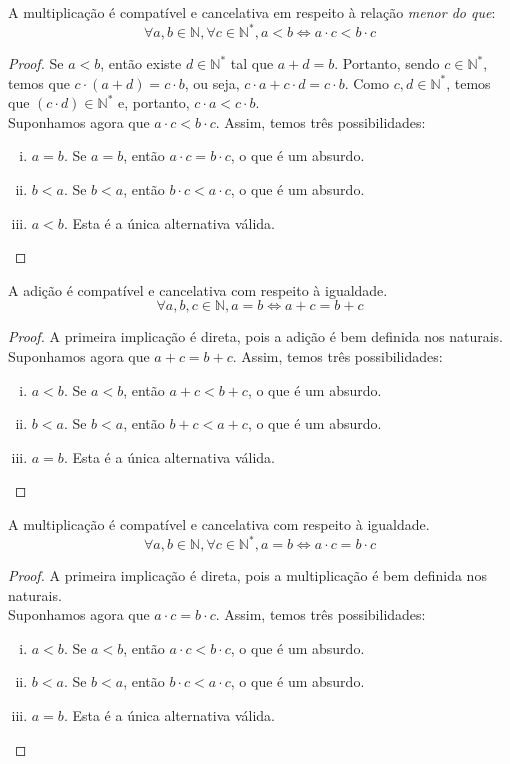 \begin{prop}
A multiplicação é compatível e cancelativa em respeito à relação \emph{menor do que}:
\[\forall a,b \in \mathbb{N}, \forall c \in \mathbb{N}^*, a<b \Leftrightarrow a\cdot c < b \cdot c\]
\begin{proof}
Se $a<b$, então existe $d \in \mathbb{N}^*$ tal que $a+d=b$. Portanto, sendo $c \in \mathbb{N}^*$, temos que $c\cdot(a+d)=c\cdot b$, ou seja, $c\cdot a + c\cdot d = c\cdot b$. Como $c,d \in \mathbb{N}^*$, temos que $(c\cdot d) \in \mathbb{N}^*$ e, portanto, $c\cdot a < c\cdot b$.\\ Suponhamos agora que $a\cdot c<b\cdot c$. Assim, temos três possibilidades:
\begin{enumerate}[(i)]
\item $a=b$. Se $a=b$, então $a\cdot c=b\cdot c$, o que é um absurdo.
\item $b<a$. Se $b<a$, então $b\cdot c<a\cdot c$, o que é um absurdo.
\item $a<b$. Esta é a única alternativa válida.
\end{enumerate}\end{proof}\end{prop}

\begin{prop}
A adição é compatível e cancelativa com respeito à igualdade.
\[\forall a,b,c \in \mathbb{N}, a=b \Leftrightarrow a+c=b+c \]
\begin{proof}
A primeira implicação é direta, pois a adição é bem definida nos naturais. \\ Suponhamos agora que $a+c=b+c$. Assim, temos três possibilidades:
\begin{enumerate}[(i)]
\item $a<b$. Se $a<b$, então $a+c<b+c$, o que é um absurdo.
\item $b<a$. Se $b<a$, então $b+c<a+c$, o que é um absurdo.
\item $a=b$. Esta é a única alternativa válida.
\end{enumerate}\end{proof}\end{prop}

\begin{prop}
A multiplicação é compatível e cancelativa com respeito à igualdade.
\[\forall a,b \in \mathbb{N},\forall c \in \mathbb{N}^*, a=b \Leftrightarrow a\cdot c=b\cdot c \]
\begin{proof}
A primeira implicação é direta, pois a multiplicação é bem definida nos naturais. \\ Suponhamos agora que $a\cdot c=b\cdot c$. Assim, temos três possibilidades:
\begin{enumerate}[(i)]
\item $a<b$. Se $a<b$, então $a\cdot c<b\cdot c$, o que é um absurdo.
\item $b<a$. Se $b<a$, então $b\cdot c<a\cdot c$, o que é um absurdo.
\item $a=b$. Esta é a única alternativa válida.
\end{enumerate}
\end{proof}
\end{prop}

